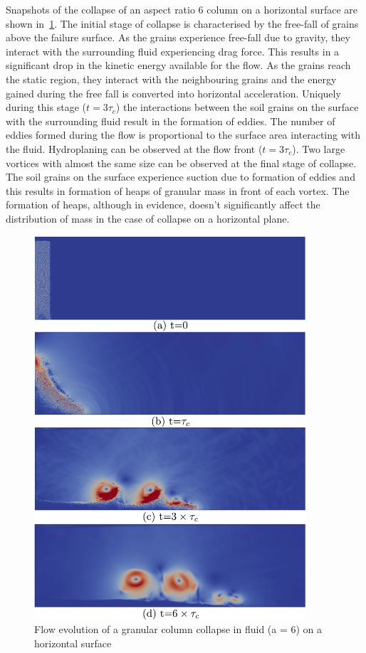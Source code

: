Snapshots of the collapse of an aspect ratio 6 column on a horizontal 
surface are shown in~\cref{fig:LBM_DEM_a6}. The initial stage of collapse is 
characterised by the free-fall of grains above the failure surface. As the 
grains experience free-fall due to gravity, they interact with the surrounding 
fluid experiencing drag force. This results in a significant drop in the 
kinetic 
energy available for the flow. As the grains reach the static region, they 
interact with the neighbouring grains and the energy gained during the free 
fall is converted into horizontal acceleration. Uniquely during this stage ($t 
= 3\tau_c$) the interactions between the soil grains on the surface with 
the surrounding fluid result in the formation of eddies. The number of eddies 
formed during the flow is proportional to the surface area interacting with the 
fluid. Hydroplaning can be observed at the flow front ($t = 3\tau_c$). Two 
large vortices with almost the same size can be observed at the final stage of 
collapse. The soil grains on the surface experience suction due to formation of 
eddies and this results in formation of heaps of granular mass in front of each 
vortex. The formation of heaps, although in evidence, doesn't significantly 
affect the distribution of mass in the case of collapse on a horizontal plane. 

\begin{figure}[htpb]
\centering
\includegraphics[width=0.9\textwidth]{LBM_DEM_a6}
\caption{Flow evolution of a granular column collapse in fluid (a = 6) on a 
horizontal surface}
\label{fig:LBM_DEM_a6}
\end{figure}


